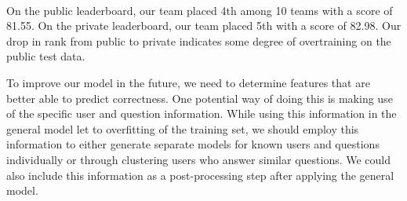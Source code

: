 \documentclass[letterpaper]{article}
\begin{document}
\paragraph{} On the public leaderboard, our team placed 4th among 10 teams with a score of 81.55. On the private leaderboard, our team placed 5th with a score of 82.98. Our drop in rank from public to private indicates some degree of overtraining on the public test data. 

To improve our model in the future, we need to determine features that are better able to predict correctness.  One potential way of doing this is making use of the specific user and question information.  While using this information in the general model let to overfitting of the training set, we should employ this information to either generate separate models for known users and questions individually or through clustering users who answer similar questions.  We could also include this information as a post-processing step after applying the general model.
\end{document}
